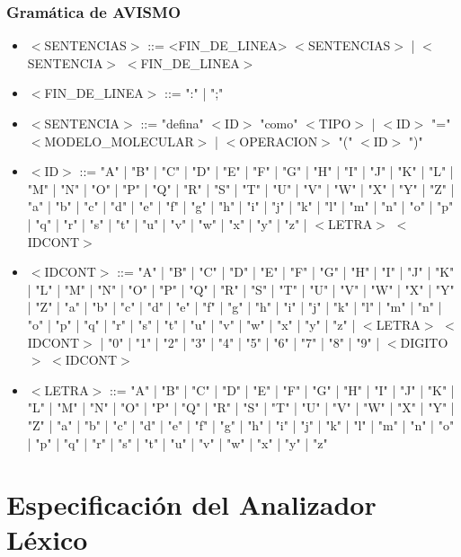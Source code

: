 \documentclass[14pt, aspectratio=169]{beamer}
\begin{document}
\begin{frame}[allowframebreaks]
    \frametitle{Gramática de AVISMO}
    \begin{itemize}
        \item $<$SENTENCIAS$>$ ::= <FIN\_DE\_LINEA> $<$SENTENCIAS$>$ | $<$SENTENCIA$>$ $<$FIN\_DE\_LINEA$>$
        \item $<$FIN\_DE\_LINEA$>$ ::= ":" | ";"
        \item $<$SENTENCIA$>$ ::= "defina" $<$ID$>$ "como" $<$TIPO$>$ | $<$ID$>$ "="  $<$MODELO\_MOLECULAR$>$ | $<$OPERACION$>$ "(" $<$ID$>$ ")"
        \item $<$ID$>$ ::= "A" | "B" | "C" | "D" | "E" | "F" | "G" | "H" | "I" | "J" | "K" | "L" | "M" | "N" | "O" | "P" | "Q" | "R" | "S" | "T" | "U" | "V" | "W" | "X" | "Y" | "Z" | "a" | "b" | "c" | "d" | "e" | "f" | "g" | "h" | "i" | "j" | "k" | "l" | "m" | "n" | "o" | "p" | "q" | "r" | "s" | "t" | "u" | "v" | "w" | "x" | "y" | "z" | $<$LETRA$>$ $<$IDCONT$>$
        \item $<$IDCONT$>$ ::= "A" | "B" | "C" | "D" | "E" | "F" | "G" | "H" | "I" | "J" | "K" | "L" | "M" | "N" | "O" | "P" | "Q" | "R" | "S" | "T" | "U" | "V" | "W" | "X" | "Y" | "Z" | "a" | "b" | "c" | "d" | "e" | "f" | "g" | "h" | "i" | "j" | "k" | "l" | "m" | "n" | "o" | "p" | "q" | "r" | "s" | "t" | "u" | "v" | "w" | "x" | "y" | "z" | $<$LETRA$>$ $<$IDCONT$>$ | "0" | "1" | "2" | "3" | "4" | "5" | "6" | "7" | "8" | "9" | $<$DIGITO$>$ $<$IDCONT$>$
        \item $<$LETRA$>$ ::= "A" | "B" | "C" | "D" | "E" | "F" | "G" | "H" | "I" | "J" | "K" | "L" | "M" | "N" | "O" | "P" | "Q" | "R" | "S" | "T" | "U" | "V" | "W" | "X" | "Y" | "Z" | "a" | "b" | "c" | "d" | "e" | "f" | "g" | "h" | "i" | "j" | "k" | "l" | "m" | "n" | "o" | "p" | "q" | "r" | "s" | "t" | "u" | "v" | "w" | "x" | "y" | "z"
    \end{itemize}
\end{frame}

\section{Especificación del Analizador Léxico}
\end{document}
